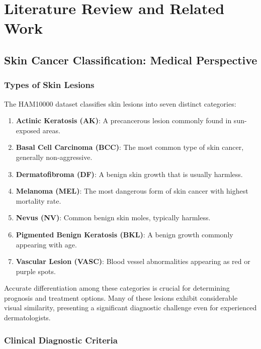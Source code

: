 \chapter{Literature Review and Related Work}
\label{ch:related_work}

\section{Skin Cancer Classification: Medical Perspective}

\subsection{Types of Skin Lesions}

The HAM10000 dataset classifies skin lesions into seven distinct categories:

\begin{enumerate}
    \item \textbf{Actinic Keratosis (AK)}: A precancerous lesion commonly found in sun-exposed areas.
    
    \item \textbf{Basal Cell Carcinoma (BCC)}: The most common type of skin cancer, generally non-aggressive.
    
    \item \textbf{Dermatofibroma (DF)}: A benign skin growth that is usually harmless.
    
    \item \textbf{Melanoma (MEL)}: The most dangerous form of skin cancer with highest mortality rate.
    
    \item \textbf{Nevus (NV)}: Common benign skin moles, typically harmless.
    
    \item \textbf{Pigmented Benign Keratosis (BKL)}: A benign growth commonly appearing with age.
    
    \item \textbf{Vascular Lesion (VASC)}: Blood vessel abnormalities appearing as red or purple spots.
\end{enumerate}

Accurate differentiation among these categories is crucial for determining prognosis and treatment options. Many of these lesions exhibit considerable visual similarity, presenting a significant diagnostic challenge even for experienced dermatologists.

\subsection{Clinical Diagnostic Criteria}

